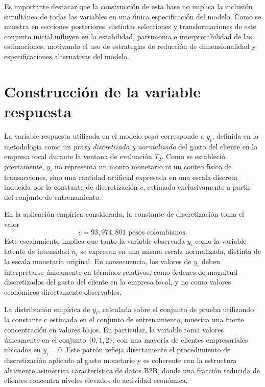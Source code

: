     Es importante destacar que la construcción de esta base no implica la inclusión simultánea de todas las variables en una única especificación del modelo. Como se muestra en secciones posteriores, distintas selecciones y transformaciones de este conjunto inicial influyen en la estabilidad, parsimonia e interpretabilidad de las estimaciones, motivando el uso de estrategias de reducción de dimensionalidad y especificaciones alternativas del modelo.

\section{Construcción de la variable respuesta}

    La variable respuesta utilizada en el modelo \emph{pogit} corresponde a \(y_i\), definida en la metodología como un \emph{proxy discretizado y normalizado} del gasto del cliente en la empresa focal durante la ventana de evaluación \(T_2\). Como se estableció previamente, \(y_i\) no representa un monto monetario ni un conteo físico de transacciones, sino una cantidad artificial expresada en una escala discreta inducida por la constante de discretización \(c\), estimada exclusivamente a partir del conjunto de entrenamiento.
    
    En la aplicación empírica considerada, la constante de discretización toma el valor
    \[
    c = 93{,}974{,}801 \text{ pesos colombianos}.
    \]
    Este escalamiento implica que tanto la variable observada \(y_i\) como la variable latente de intensidad \(n_i\) se expresan en una misma escala normalizada, distinta de la escala monetaria original. En consecuencia, los valores de \(y_i\) deben interpretarse únicamente en términos relativos, como órdenes de magnitud discretizados del gasto del cliente en la empresa focal, y no como valores económicos directamente observables.
    
    La distribución empírica de \(y_i\), calculada sobre el conjunto de prueba utilizando la constante \(c\) estimada en el conjunto de entrenamiento, muestra una fuerte concentración en valores bajos. En particular, la variable toma valores únicamente en el conjunto \(\{0,1,2\}\), con una mayoría de clientes empresariales ubicados en \(y_i = 0\). Este patrón refleja directamente el procedimiento de discretización aplicado al gasto monetario y es coherente con la estructura altamente asimétrica característica de datos B2B, donde una fracción reducida de clientes concentra niveles elevados de actividad económica.
    
